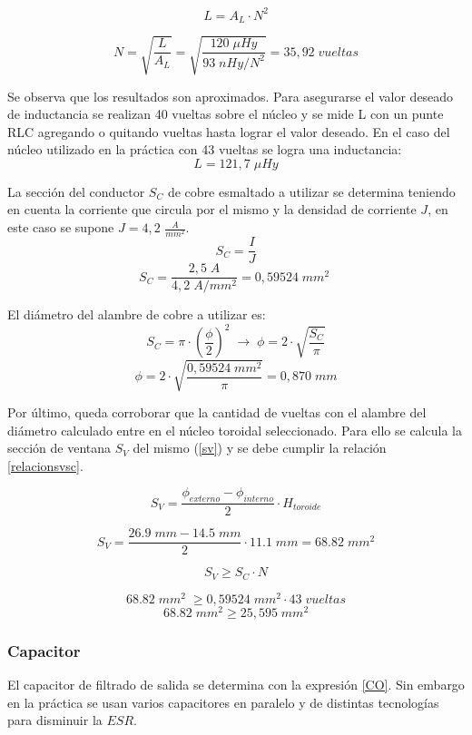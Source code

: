 \documentclass[11pt, a4paper]{article}
\begin{document}
\begin{equation}
L = A_L \cdot N^2
\label{A_L}
\end{equation}

\[N = \sqrt{\frac{L}{A_L}} = \sqrt{\frac{120 \; \mu Hy}{93 \; nHy/N^2}} = 35,92 \; vueltas\]

Se observa que los resultados son aproximados. Para asegurarse el valor deseado de inductancia se realizan 40 vueltas sobre el núcleo y se mide L con un punte RLC agregando o quitando vueltas hasta lograr el valor deseado. En el caso del núcleo utilizado en la práctica con 43 vueltas se logra una inductancia:
\[ L = 121,7 \; \mu Hy\]

La sección del conductor $S_C$ de cobre esmaltado a utilizar se determina teniendo en cuenta la corriente que circula por el mismo y la densidad de corriente $J$, en este caso se supone $J = 4,2$ $\frac{A}{mm^2}$.
\begin{equation}
S_C = \frac{I}{J}
\label{S_C}
\end{equation}
\[S_C = \frac{2,5 \; A}{4,2 \; A/mm^2} = 0,59524 \; mm^2 \; \]

El diámetro del alambre de cobre a utilizar es:
\[S_C = \pi \cdot (\frac{\phi}{2})^2 \; \rightarrow \; \phi = 2 \cdot \sqrt{\frac{S_C}{\pi}} \]
\[\phi = 2 \cdot \sqrt{\frac{0,59524 \; mm^2}{\pi}} = 0,870 \; mm \]

Por último, queda corroborar que la cantidad de vueltas con el alambre del diámetro calculado entre en el núcleo toroidal seleccionado. Para ello se calcula la sección de ventana $S_V$ del mismo (\ref{sv}) y se debe cumplir la relación \ref{relacionsvsc}.

\begin{equation}
S_V = \frac{\phi_{externo} - \phi_{interno}}{2} \cdot H_{toroide}
\label{sv} 
\end{equation}

\[S_V = \frac{26.9 \; mm - 14.5 \; mm}{2} \cdot 11.1 \; mm = 68.82 \; mm^2\]

\begin{equation}
S_V \geq S_C \cdot N
\label{relacionsvsc}
\end{equation}

\[68.82 \; mm^2 \; \geq 0,59524 \; mm^2 \cdot 43 \; vueltas \]
\[68.82 \; mm^2 \geq 25,595 \; mm^2 \]

\subsubsection{Capacitor}
El capacitor de filtrado de salida se determina con la expresión \ref{CO}. Sin embargo en la práctica se usan varios capacitores en paralelo y de distintas tecnologías para disminuir la $ESR$.
\end{document}

